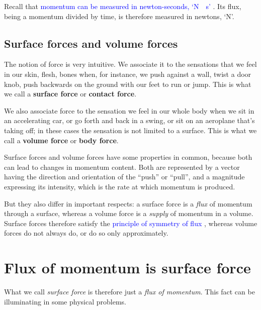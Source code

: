 \documentclass[a4paper,12pt,%
onecolumn,oneside,%
british%
]{memoir}
\renewcommand*{\|}[1][]{\nonscript\:#1\vert\nonscript\:\mathopen{}}
\newcommand*{\sect}{\S}%
\renewcommand*{\autoref}[3][\sect\,\ref]{\textcolor{blue}{#3}
\raisebox{0.6ex}{\color{blue}\miniscule%
\faIcon{angle-right}%
\;#1{#2}\;p.\,\pageref{#2}}}
\begin{document}
Recall that \autoref{sec:intro_momentum}{momentum can be measured in newton-seconds, \enquote*{\unit{N\cdot s}}}. Its flux, being a momentum divided by time, is therefore measured in newtons, \enquote*{\unit{N}}.

\subsection{Surface forces and volume forces}
\label{sec:contact_volume_forces}

The notion of force is very intuitive. We associate it to the sensations that we feel in our skin, flesh, bones when, for instance, we push against a wall, twist a door knob, push backwards on the ground with our feet to run or jump. This is what we call a \textbf{surface force} or \textbf{contact force}.

We also associate force to the sensation we feel in our whole body when we sit in an accelerating car, or go forth and back in a swing, or sit on an aeroplane that's taking off; in these cases the sensation is not limited to a surface. This is what we call a \textbf{volume force} or \textbf{body force}.

Surface forces and volume forces have some properties in common, because both can lead to changes in momentum content. Both are represented by a vector having the direction and orientation of the \enquote{push} or \enquote{pull}, and a magnitude expressing its intensity, which is the rate at which momentum is produced.

But they also differ in important respects: a surface force is a \emph{flux} of momentum through a surface, whereas a volume force is a \emph{supply} of momentum in a volume. Surface forces therefore satisfy the \autoref{def:symmetryflux}{principle of symmetry of flux}, whereas volume forces do not always do, or do so only approximately.

\section{Flux of momentum is surface force}
\label{sec:visualize_force}

What we call \emph{surface force} is therefore just a \emph{flux of momentum}. This fact can be illuminating in some physical problems.
\end{document}
